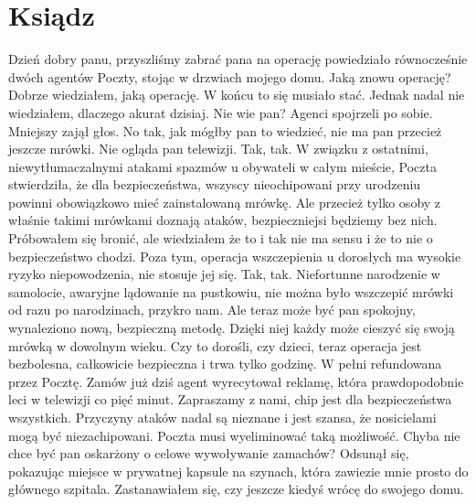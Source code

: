 \chapter{Ksiądz} 


\begin{dialogue}
\ds{} Dzień dobry panu, przyszliśmy zabrać pana na operację \dm{} powiedziało równocześnie dwóch agentów Poczty, stojąc w drzwiach mojego domu.
\ds{} Jaką znowu operację? \dm{} Dobrze wiedziałem, jaką operację. W końcu to się musiało stać. Jednak nadal nie wiedziałem, dlaczego akurat dzisiaj.
\ds{} Nie wie pan? \dm{} Agenci spojrzeli po sobie. Mniejszy zajął głos. \dm{} No tak, jak mógłby pan to wiedzieć, nie ma pan przecież jeszcze mrówki. Nie ogląda pan telewizji.
Tak, tak.
W związku z ostatnimi, niewytłumaczalnymi atakami spazmów u obywateli w całym mieście, Poczta stwierdziła, że dla bezpieczeństwa, 
wszyscy nieochipowani przy urodzeniu powinni obowiązkowo mieć zainstalowaną mrówkę.
\ds{} Ale przecież tylko osoby z właśnie takimi mrówkami doznają ataków, bezpieczniejsi będziemy bez nich. \dm{} Próbowałem się bronić, ale wiedziałem że
to i tak nie ma sensu i że to nie o bezpieczeństwo chodzi. \dm{} Poza tym, operacja wszczepienia u dorosłych ma wysokie ryzyko niepowodzenia, nie stosuje jej się.
\ds{} Tak, tak. Niefortunne narodzenie w samolocie, awaryjne lądowanie na pustkowiu, nie można było wszczepić mrówki od razu po narodzinach, przykro nam.
Ale teraz może być pan spokojny, wynaleziono nową, bezpieczną metodę. Dzięki niej każdy może cieszyć się swoją mrówką w dowolnym wieku.
Czy to dorośli, czy dzieci, teraz operacja jest bezbolesna, całkowicie bezpieczna i trwa tylko godzinę.
W pełni refundowana przez Pocztę. Zamów już dziś \dm{} agent wyrecytował reklamę, która prawdopodobnie leci w telewizji co pięć minut. \dm{}
Zapraszamy z nami, chip jest dla bezpieczeństwa wszystkich. Przyczyny ataków nadal są nieznane i jest szansa, że nosicielami mogą być niezachipowani.
Poczta musi wyeliminować taką możliwość.
Chyba nie chce być pan oskarżony o celowe wywoływanie zamachów? \dm{} Odsunął się, pokazując miejsce w prywatnej kapsule na szynach, która zawiezie mnie prosto do 
głównego szpitala. Zastanawiałem się, czy jeszcze kiedyś wrócę do swojego domu.
\end{dialogue}

\divider{}

